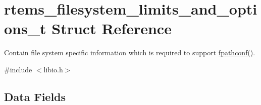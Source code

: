 \hypertarget{structrtems__filesystem__limits__and__options__t}{}\section{rtems\+\_\+filesystem\+\_\+limits\+\_\+and\+\_\+options\+\_\+t Struct Reference}
\label{structrtems__filesystem__limits__and__options__t}


Contain file system specific information which is required to support \mbox{\hyperlink{fpathconf_8c_a71e43208c97faad6658a5f7d7daa92cd}{fpathconf()}}.  




{\ttfamily \#include $<$libio.\+h$>$}

\subsection*{Data Fields}
